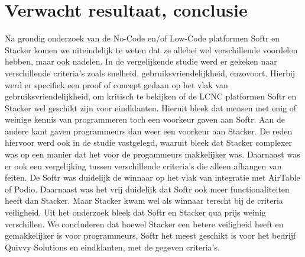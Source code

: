 \section{Verwacht resultaat, conclusie}%
\label{sec:verwachte_resultaten}
Na grondig onderzoek van de No-Code en/of Low-Code platformen Softr en Stacker komen we uiteindelijk te weten dat ze allebei wel verschillende voordelen hebben, maar ook nadelen.
In de vergelijkende studie werd er gekeken naar verschillende criteria's zoals snelheid, gebruiksvriendelijkheid, enzovoort. Hierbij werd er specifiek een proof of concept gedaan op het vlak van gebruiksvriendelijkheid, om kritisch te bekijken of de LCNC platformen Softr en Stacker wel geschikt zijn voor eindklanten.
Hieruit bleek dat mensen met enig of weinige kennis van programmeren toch een voorkeur gaven aan Softr. Aan de andere kant gaven programmeurs dan weer een voorkeur aan Stacker. De reden hiervoor werd ook in de studie vastgelegd, waaruit bleek dat Stacker complexer was op een manier dat het voor de progammeurs makkelijker was.
Daarnaast was er ook een vergelijking tussen verschillende criteria's die alleen afhangen van feiten. De Softr was duidelijk de winnaar op het vlak van integratie met AirTable of Podio. Daarnaast was het vrij duidelijk dat Softr ook meer functionaliteiten heeft dan Stacker. Maar Stacker kwam wel als winnaar terecht bij de criteria veiligheid.
Uit het onderzoek bleek dat Softr en Stacker qua prijs weinig verschillen. We concluderen dat hoewel Stacker een betere veiligheid heeft en gemakkelijker is voor programmeurs, Softr het meest geschikt is voor het bedrijf Quivvy Solutions en eindklanten, met de gegeven criteria's.





